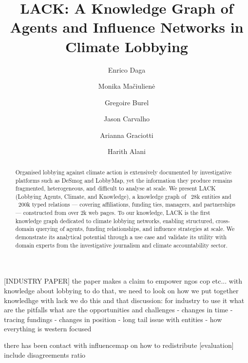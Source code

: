 \documentclass[runningheads]{llncs}
\begin{document}
\title{LACK: A Knowledge Graph of Agents and Influence Networks in Climate Lobbying}

\author{Enrico Daga \and
Monika Mačiulienė \and
Gregoire Burel \and
Jason Carvalho \and
Arianna Graciotti \and
Harith Alani }



\maketitle
[INDUSTRY PAPER]
the paper makes a claim to empower ngos cop etc... with knowledge about lobbying
to do that, we need to look on how we put together knowledhge
with lack we do this and that
discussion: for industry to use it what are the pitfalls what are the opportunities and challenges
- changes in time
- tracing fundings
- changes in position
- long tail issue with entities
- how everything is western focused

there has been contact with influencemap on how to redistribute
[evaluation]
include disagreements ratio
\begin{abstract}
Organised lobbying against climate action is extensively documented by investigative platforms such as DeSmog and LobbyMap, yet the information they produce remains fragmented, heterogeneous, and difficult to analyse at scale. We present LACK (Lobbying Agents, Climate, and Knowledge), a knowledge graph of ~28k entities and ~200k typed relations — covering affiliations, funding ties, managers, and partnerships — constructed from over 2k web pages.
To our knowledge, LACK is the first knowledge graph dedicated to climate lobbying networks, enabling structured, cross-domain querying of agents, funding relationships, and influence strategies at scale.
We demonstrate its analytical potential through a use case and validate its utility with domain experts from the investigative journalism and climate accountability sector.

\end{abstract}
\end{document}
